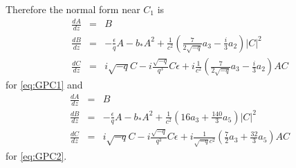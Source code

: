 Therefore the normal form near $C_1$ is 
\begin{subequations}\label{eq:GPC1normal}
\begin{eqnarray} \label{eq:GPC1normalA}
\frac{dA}{dz} &=& B \\ 
\frac{dB}{dz} &=& -\frac{\epsilon}{q} A - b_* A^2 + \frac{1}{c^2}\left( \frac{7}{2 \sqrt{-q} } a_3 - \frac{i}{3} a_2 \right)  \left|C\right|^2  \label{eq:GPC1normalB} \\
\frac{dC}{dz} &=& i \sqrt{-q} C - i \frac{\sqrt{-q} }{q^3} C\epsilon + i \frac{1}{c^2}\left( \frac{7}{2 \sqrt{-q} } a_3 - \frac{i}{3} a_2 \right)A C \label{eq:GPC1normalC}
\end{eqnarray}
\end{subequations}
for \eqref{eq:GPC1} and
\begin{subequations}\label{eq:GPC2normal}
\begin{eqnarray} \label{eq:GPC2normalA}
\frac{dA}{dz} &=& B \\ 
\frac{dB}{dz} &=& -\frac{\epsilon}{q} A - b_* A^2 + \frac{1}{c^2}\left( 16 a_3 + \frac{140}{3} a_5 \right)  \left|C\right|^2  \label{eq:GPC2normalB} \\
\frac{dC}{dz} &=& i \sqrt{-q} C - i \frac{\sqrt{-q} }{q^3} C\epsilon + i \frac{1}{\sqrt{-q} c^2}\left( \frac{7}{2 } a_3 + \frac{32}{3} a_5 \right)A C \label{eq:GPC2normalC}
\end{eqnarray}
\end{subequations}
for \eqref{eq:GPC2}.

